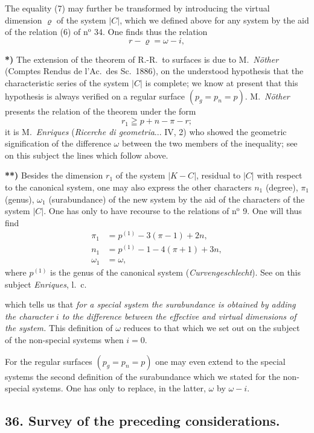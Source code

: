 \documentclass{article}
\begin{document}
The equality (7) may further be transformed by introducing the virtual dimension $\varrho$ of the system $|C|$, which we defined above for any system by the aid of the relation (6) of n${}^{\text{o}}$ 34. One finds thus the relation
\[ r - \varrho = \omega - i, \]

\textbf{*)} The extension of the theorem of R.-R.\ to surfaces is due to M.\ \emph{Nöther} (Comptes Rendus de l'Ac.\ des Sc.\ 1886), on the understood hypothesis that the characteristic series of the system $|C|$ is complete; we know at present that this hypothesis is always verified on a regular surface $(p_{g}=p_{n}=p)$. M.\ \emph{Nöther} presents the relation of the theorem under the form
\[ r_{1} \geqq p + n - \pi - r; \]
it is M.\ \emph{Enriques} (\emph{Ricerche di geometria}... IV, 2) who showed the geometric signification of the difference $\omega$ between the two members of the inequality; see on this subject the lines which follow above.

\textbf{**)} Besides the dimension $r_{1}$ of the system $|K-C|$, residual to $|C|$ with respect to the canonical system, one may also express the other characters $n_{1}$ (degree), $\pi_{1}$ (genus), $\omega_{1}$ (surabundance) of the new system by the aid of the characters of the system $|C|$. One has only to have recourse to the relations of n${}^{\text{o}}$ 9. One will thus find
\[ \begin{aligned} \pi_{1} &= p^{(1)} - 3(\pi-1) + 2n, \\ n_{1} &= p^{(1)} - 1 - 4(\pi+1) + 3n, \\ \omega_{1} &= \omega, \end{aligned} \]
where $p^{(1)}$ is the genus of the canonical system (\emph{Curvengeschlecht}). See on this subject \emph{Enriques}, l.\ c.

which tells us that \emph{for a special system the surabundance is obtained by adding the character $i$ to the difference between the effective and virtual dimensions of the system.} This definition of $\omega$ reduces to that which we set out on the subject of the non-special systems when $i = 0$.

For the regular surfaces $(p_{g} = p_{n} = p)$ one may even extend to the special systems the second definition of the surabundance which we stated for the non-special systems. One has only to replace, in the latter, $\omega$ by $\omega - i$.

\subsection*{36. Survey of the preceding considerations.}
\end{document}
